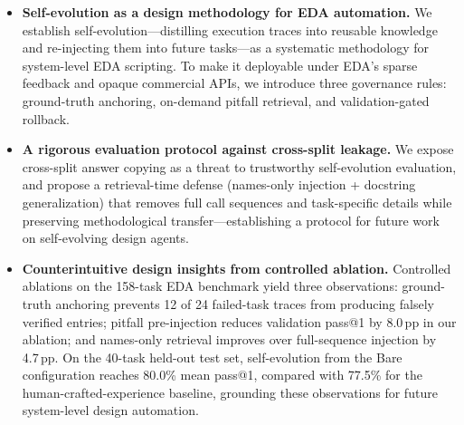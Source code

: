 \begin{itemize}[leftmargin=*]
\item \textbf{Self-evolution as a design methodology for EDA automation.} 
We establish self-evolution---distilling execution traces into reusable knowledge and re-injecting them into future tasks---as a systematic methodology for system-level EDA scripting. To make it deployable under EDA's sparse feedback and opaque commercial APIs, we introduce three governance rules: ground-truth anchoring, on-demand pitfall retrieval, and validation-gated rollback.

\item \textbf{A rigorous evaluation protocol against cross-split leakage.} 
We expose cross-split answer copying as a threat to trustworthy self-evolution evaluation, and propose a retrieval-time defense (names-only injection + docstring generalization) that removes full call sequences and task-specific details while preserving methodological transfer---establishing a protocol for future work on self-evolving design agents.

\item \textbf{Counterintuitive design insights from controlled ablation.} 
Controlled ablations on the 158-task EDA benchmark yield three observations: ground-truth anchoring prevents 12 of 24 failed-task traces from producing falsely verified entries; pitfall pre-injection reduces validation pass@1 by 8.0\,pp in our ablation; and names-only retrieval improves over full-sequence injection by 4.7\,pp. On the 40-task held-out test set, self-evolution from the Bare configuration reaches 80.0\% mean pass@1, compared with 77.5\% for the human-crafted-experience baseline, grounding these observations for future system-level design automation.
\end{itemize}
